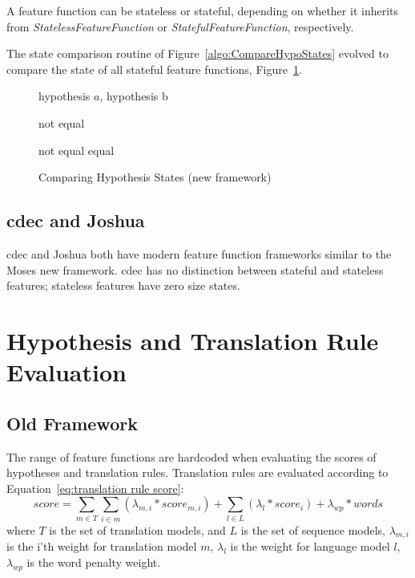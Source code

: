 \documentclass{pbml}
\begin{document}
A feature function can be stateless or stateful, depending on whether it inherits from \emph{StatelessFeatureFunction} or \emph{StatefulFeatureFunction}, respectively.

The state comparison routine of Figure~\ref{algo:CompareHypoStates} evolved to compare the state of all stateful feature functions, Figure~\ref{algo:CompareHypoStates.new}.

\begin{figure} [h!]
\small 
\begin{algorithmic}
\REQUIRE hypothesis $a$, hypothesis b

	\RETURN not equal
       \ENDIF
       
	    \RETURN not equal
	 \ENDIF
        \ENDFOR
        \RETURN equal

\end{algorithmic}
\caption{Comparing Hypothesis States (new framework)}
\label{algo:CompareHypoStates.new}
\end{figure} 
        
\subsection{cdec and Joshua}
cdec and Joshua both have modern feature function frameworks similar to the Moses new framework. cdec has no distinction between stateful and stateless features; stateless features have zero size states.

\section{Hypothesis and Translation Rule Evaluation}
\subsection{Old Framework}
The range of feature functions are hardcoded when evaluating the scores of hypotheses and translation rules. Translation rules are evaluated according to Equation~\ref{eq:translation rule score}:
\begin{equation}
  score = \sum_{m \in T} \sum_{i \in m} (\lambda_{m,i} * score_{m,i}) + \sum_{l  \in L} (\lambda_l * score_i) + \lambda_{wp} * words
\label{eq:translation rule score}
\end{equation}
where $T$ is the set of translation models, and $L$ is the set of sequence models, $\lambda_{m,i}$ is the i'th weight for translation model $m$, $\lambda_l$ is the weight for language model $l$, $\lambda_{wp}$ is the word penalty weight.
\end{document}
